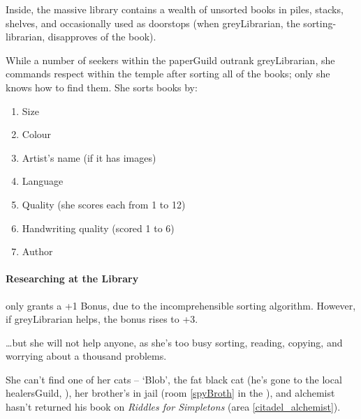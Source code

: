 \begin{multicols}{2}
Inside, the massive library contains a wealth of unsorted books in piles, stacks, shelves, and occasionally used as doorstops (when \gls{greyLibrarian}, the sorting-librarian, disapproves of the book).

While a number of \glspl{seeker} within the \gls{paperGuild} outrank \gls{greyLibrarian}, she commands respect within the temple after sorting all of the books; only she knows how to find them.
She sorts books by:

\begin{multicols}{2}
\begin{enumerate}
  \item
  Size
  \item
  Colour
  \item
  Artist's name (if it has images)
  \item
  Language
  \item
  Quality (she scores each from 1 to 12)
  \item
  Handwriting quality (scored 1 to 6)
  \item
  Author
\end{enumerate}
\end{multicols}

\paragraph{Researching at the Library}
only grants a +1 Bonus, due to the incomprehensible sorting algorithm.
However, if \gls{greyLibrarian} helps, the bonus rises to +3.

\ldots but she will not help anyone, as she's too busy sorting, reading, copying, and worrying about a thousand problems.

She can't find one of her cats -- `Blob', the fat black cat (he's gone to the local \gls{healersGuild}, ),
her brother's in jail (room  \vref{spyBroth} in the ), and \gls{alchemist} hasn't returned his book on \textit{Riddles for Simpletons} (area \vref{citadel_alchemist}).
\label{paperCat}



\end{multicols}

